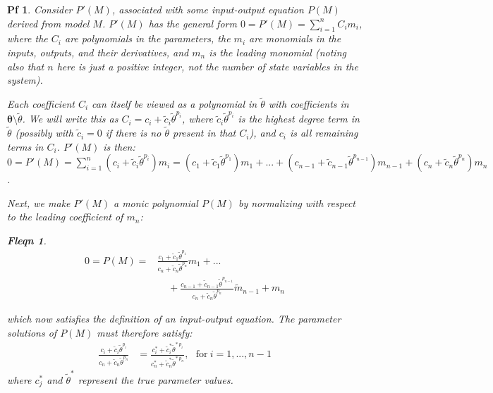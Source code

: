 \documentclass[10pt,a4paper]{amsart}
\newtheorem{pf}{Pf}
\newtheorem{fleqn}{Fleqn}
\begin{document}
\begin{pf}
    Consider $P'(M)$, associated with some input-output equation $P(M)$ derived from model $M$. 
    $P'(M)$ has the general form $0 = P'(M) = \sum_{i = 1}^n C_i m_i$, where the $C_i$ are polynomials in the parameters, the $m_i$ are monomials in the inputs, outputs, and their derivatives, and $m_n$ is the \textit{leading monomial} (noting also that $n$ here is just a positive integer, not the number of state variables in the system).
    
    Each coefficient $C_i$ can itself be viewed as a polynomial in $\tilde{\theta}$ with coefficients in $\pmb{\theta}\setminus\tilde{\theta}$. We will write this as $C_i = c_i + \tilde{c}_i \tilde{\theta}^{p_i}$, where  $\tilde{c}_i \tilde{\theta}^{p_i}$ is the highest degree term in $\tilde{\theta}$ (possibly with $\tilde{c}_i=0$ if there is no $\tilde{\theta}$ present in that $C_i$), and $c_i$ is all remaining terms in $C_i$. $P'(M)$ is then: $0 = P'(M) = \sum_{i = 1}^n (c_i + \tilde{c}_i \tilde{\theta}^{p_i}) m_i = (c_1 + \tilde{c}_1 \tilde{\theta}^{p_1}) m_1 + ... + (c_{n-1} + \tilde{c}_{n-1} \tilde{\theta}^{p_{n-1}}) m_{n-1} + (c_{n} + \tilde{c}_{n} \tilde{\theta}^{p_{n}}) m_{n}$.

    Next, we make $P'(M)$ a monic polynomial $P(M)$ by normalizing with respect to the leading coefficient of $m_n$:
    \begin{fleqn}
    \begin{align*}
        0 = P(M) = &\frac{c_1 + \tilde{c}_1 \tilde{\theta}^{p_1}}{c_{n} + \tilde{c}_{n} \tilde{\theta}^{p_{n}}} m_1 + ... \\&~~~~~+ \frac{c_{n-1} + \tilde{c}_{n-1} \tilde{\theta}^{p_{n-1}}}{c_{n} + \tilde{c}_{n} \tilde{\theta}^{p_{n}}} \tilde{m}_{n-1} + m_n
    \end{align*}
    \end{fleqn}
    which now satisfies the definition of an input-output equation. The parameter solutions of $P(M)$ must therefore satisfy:
    \begin{align}
        \frac{c_i + \tilde{c}_i \tilde{\theta}^{p_i}}{c_n + \tilde{c}_n \tilde{\theta}^{p_n}} & = \frac{c^*_i + \tilde{c}_i^* \tilde{\theta}^{*~p_i}}{c_n^* + \tilde{c}_n^* \tilde{\theta}^{*~p_n}}, ~~~\text{for}~i=1,...,n-1 \label{psoln_thm1}
    \end{align}
    where $c_j^*$ and $\tilde{\theta}^*$ represent the true parameter values.
    

\end{pf}
\end{document}
